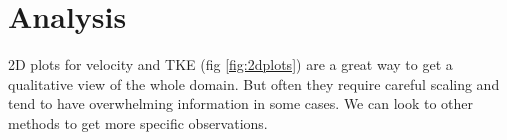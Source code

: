 %
%

\chapter{Analysis}

2D plots for velocity and TKE (fig \ref{fig:2dplots}) are a great way to get a qualitative view of the whole domain. But often they require careful scaling and tend to have overwhelming information in some cases. We can look to other methods to get more specific observations.

